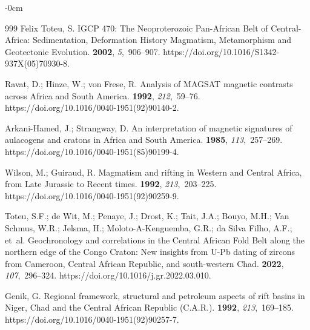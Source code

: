 \documentclass[minerals,article,accept,pdftex,moreauthors]{Definitions/mdpi}
\begin{document}
\begin{adjustwidth}{-\extralength}{0cm}
\begin{thebibliography}{999}
{Felix Toteu}, S.
\newblock IGCP 470: The Neoproterozoic Pan-African Belt of Central-Africa:
  Sedimentation, Deformation History Magmatism, Metamorphism and Geotectonic
  Evolution.
 {\bf 2002}, {\em 5},~906--907.
\newblock https://doi.org/10.1016/S1342-937X(05)70930-8.

Ravat, D.; Hinze, W.; {von Frese}, R.
\newblock Analysis of MAGSAT magnetic contrasts across Africa and South
  America.
 {\bf 1992}, {\em 212},~59--76.
\newblock %
  https://doi.org/10.1016/0040-1951(92)90140-2.

Arkani-Hamed, J.; Strangway, D.
\newblock An interpretation of magnetic signatures of aulacogens and cratons in
  Africa and South America.
 {\bf 1985}, {\em 113},~257--269.
\newblock https://doi.org/10.1016/0040-1951(85)90199-4.

Wilson, M.; Guiraud, R.
\newblock Magmatism and rifting in Western and Central Africa, from Late
  Jurassic to Recent times.
 {\bf 1992}, {\em 213},~203--225.  %
\newblock 
  https://doi.org/10.1016/0040-1951(92)90259-9.

Toteu, S.F.; {de Wit}, M.; Penaye, J.; Drost, K.; Tait, J.A.; Bouyo, M.H.; {Van
  Schmus}, W.R.; Jelsma, H.; Moloto-A-Kenguemba, G.R.; {da Silva Filho}, A.F.;
  et~al.
\newblock Geochronology and correlations in the Central African Fold Belt along
  the northern edge of the Congo Craton: New insights from U-Pb dating of
  zircons from Cameroon, Central African Republic, and south-western Chad.
 {\bf 2022}, {\em 107},~296--324.
\newblock https://doi.org/10.1016/j.gr.2022.03.010.

Genik, G.
\newblock Regional framework, structural and petroleum aspects of rift basins
  in Niger, Chad and the Central African Republic (C.A.R.).
 {\bf 1992}, {\em 213},~169--185. %
\newblock 
  https://doi.org/10.1016/0040-1951(92)90257-7.


\end{thebibliography}
\end{adjustwidth}
\end{document}
